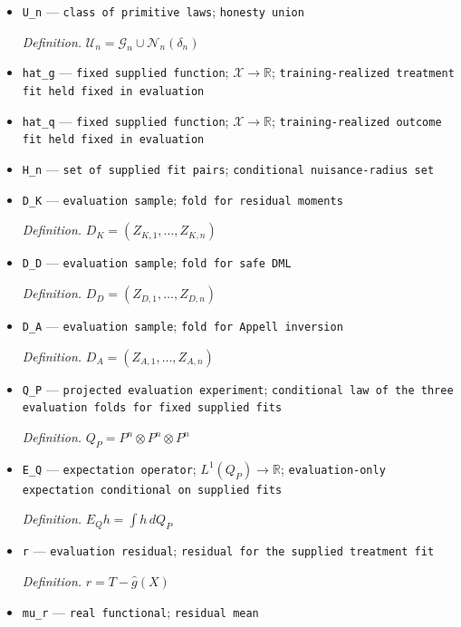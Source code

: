 \documentclass{article}
\begin{document}
\begin{itemize}
  \item \texttt{U\_\allowbreak{}n} --- \texttt{class of primitive laws}; \texttt{honesty union}
  \par\smallskip\noindent\emph{Definition.} \(\mathcal U_n=\mathcal G_n\cup\mathcal N_n(\delta_n)\)
  \item \texttt{hat\_\allowbreak{}g} --- \texttt{fixed supplied function}; \(\mathcal X\to\mathbb R\); \texttt{training-\allowbreak{}realized treatment fit held fixed in evaluation}
  \item \texttt{hat\_\allowbreak{}q} --- \texttt{fixed supplied function}; \(\mathcal X\to\mathbb R\); \texttt{training-\allowbreak{}realized outcome fit held fixed in evaluation}
  \item \texttt{H\_\allowbreak{}n} --- \texttt{set of supplied fit pairs}; \texttt{conditional nuisance-\allowbreak{}radius set}
  \item \texttt{D\_\allowbreak{}K} --- \texttt{evaluation sample}; \texttt{fold for residual moments}
  \par\smallskip\noindent\emph{Definition.} \(D_K=(Z_{K,1},\ldots,Z_{K,n})\)
  \item \texttt{D\_\allowbreak{}D} --- \texttt{evaluation sample}; \texttt{fold for safe DML}
  \par\smallskip\noindent\emph{Definition.} \(D_D=(Z_{D,1},\ldots,Z_{D,n})\)
  \item \texttt{D\_\allowbreak{}A} --- \texttt{evaluation sample}; \texttt{fold for Appell inversion}
  \par\smallskip\noindent\emph{Definition.} \(D_A=(Z_{A,1},\ldots,Z_{A,n})\)
  \item \texttt{Q\_\allowbreak{}P} --- \texttt{projected evaluation experiment}; \texttt{conditional law of the three evaluation folds for fixed supplied fits}
  \par\smallskip\noindent\emph{Definition.} \(Q_P=P^n\otimes P^n\otimes P^n\)
  \item \texttt{E\_\allowbreak{}Q} --- \texttt{expectation operator}; \(L^1(Q_P)\to\mathbb R\); \texttt{evaluation-\allowbreak{}only expectation conditional on supplied fits}
  \par\smallskip\noindent\emph{Definition.} \(E_Qh=\int h\,dQ_P\)
  \item \texttt{r} --- \texttt{evaluation residual}; \texttt{residual for the supplied treatment fit}
  \par\smallskip\noindent\emph{Definition.} \(r=T-\widehat g(X)\)
  \item \texttt{mu\_\allowbreak{}r} --- \texttt{real functional}; \texttt{residual mean}

\end{itemize}
\end{document}
